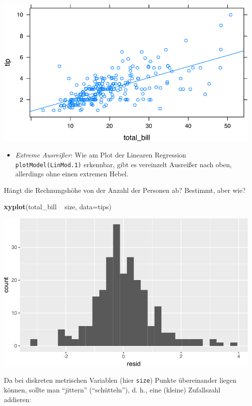\documentclass[12pt,]{book}
\newenvironment{Shaded}{\begin{snugshade}}{\end{snugshade}}
\newcommand{\KeywordTok}[1]{\textcolor[rgb]{0.13,0.29,0.53}{\textbf{{#1}}}}
\newcommand{\DataTypeTok}[1]{\textcolor[rgb]{0.13,0.29,0.53}{{#1}}}
\newcommand{\StringTok}[1]{\textcolor[rgb]{0.31,0.60,0.02}{{#1}}}
\newcommand{\NormalTok}[1]{{#1}}
\providecommand{\tightlist}{%
  \setlength{\itemsep}{0pt}\setlength{\parskip}{0pt}}
\begin{document}
\begin{center}\includegraphics[width=0.7\linewidth]{071_Regression_files/figure-latex/unnamed-chunk-8-1} \end{center}

\begin{itemize}
\tightlist
\item
  \emph{Extreme Ausreißer}: Wie am Plot der Linearen Regression
  \texttt{plotModel(LinMod.1)} erkennbar, gibt es vereinzelt Ausreißer
  nach oben, allerdings ohne einen extremen Hebel.
\end{itemize}

Hängt die Rechnungshöhe von der Anzahl der Personen ab? Bestimmt, aber
wie?

\begin{Shaded}
\begin{Highlighting}[]
\KeywordTok{xyplot}\NormalTok{(total_bill ~}\StringTok{ }\NormalTok{size, }\DataTypeTok{data=}\NormalTok{tips)}
\end{Highlighting}
\end{Shaded}

\begin{center}\includegraphics[width=0.7\linewidth]{071_Regression_files/figure-latex/unnamed-chunk-9-1} \end{center}

Da bei diskreten metrischen Variablen (hier \texttt{size}) Punkte
übereinander liegen können, sollte man ``jittern'' (``schütteln''), d.
h., eine (kleine) Zufallszahl addieren:
\end{document}
